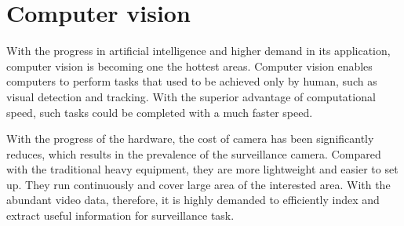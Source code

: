 \section{Computer vision}
\label{sec:intro-cv}


With the progress in artificial intelligence and higher demand in its application, computer vision is becoming one the hottest areas. 
Computer vision enables computers to perform tasks that used to be achieved only by human, such as visual detection and tracking. 
With the superior advantage of computational speed, such tasks could be completed with a much faster speed.

With the progress of the hardware, the cost of camera has been significantly reduces, which results in the prevalence of the surveillance camera. 
Compared with the traditional heavy equipment, they are more lightweight and easier to set up.
They run continuously and cover large area of the interested area. 
With the abundant video data, therefore, it is highly demanded to efficiently index and extract useful information for surveillance task.

